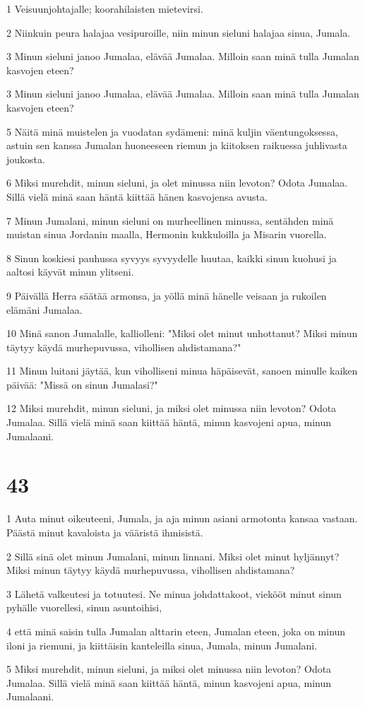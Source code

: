 \par 1 Veisuunjohtajalle; koorahilaisten mietevirsi.
\par 2 Niinkuin peura halajaa vesipuroille, niin minun sieluni halajaa sinua, Jumala.
\par 3 Minun sieluni janoo Jumalaa, elävää Jumalaa. Milloin saan minä tulla Jumalan kasvojen eteen?
\par 3 Minun sieluni janoo Jumalaa, elävää Jumalaa. Milloin saan minä tulla Jumalan kasvojen eteen?
\par 5 Näitä minä muistelen ja vuodatan sydämeni: minä kuljin väentungoksessa, astuin sen kanssa Jumalan huoneeseen riemun ja kiitoksen raikuessa juhlivasta joukosta.
\par 6 Miksi murehdit, minun sieluni, ja olet minussa niin levoton? Odota Jumalaa. Sillä vielä minä saan häntä kiittää hänen kasvojensa avusta.
\par 7 Minun Jumalani, minun sieluni on murheellinen minussa, sentähden minä muistan sinua Jordanin maalla, Hermonin kukkuloilla ja Misarin vuorella.
\par 8 Sinun koskiesi pauhussa syvyys syvyydelle huutaa, kaikki sinun kuohusi ja aaltosi käyvät minun ylitseni.
\par 9 Päivällä Herra säätää armonsa, ja yöllä minä hänelle veisaan ja rukoilen elämäni Jumalaa.
\par 10 Minä sanon Jumalalle, kalliolleni: "Miksi olet minut unhottanut? Miksi minun täytyy käydä murhepuvussa, vihollisen ahdistamana?"
\par 11 Minun luitani jäytää, kun viholliseni minua häpäisevät, sanoen minulle kaiken päivää: "Missä on sinun Jumalasi?"
\par 12 Miksi murehdit, minun sieluni, ja miksi olet minussa niin levoton? Odota Jumalaa. Sillä vielä minä saan kiittää häntä, minun kasvojeni apua, minun Jumalaani.

\chapter{43}

\par 1 Auta minut oikeuteeni, Jumala, ja aja minun asiani armotonta kansaa vastaan. Päästä minut kavaloista ja vääristä ihmisistä.
\par 2 Sillä sinä olet minun Jumalani, minun linnani. Miksi olet minut hyljännyt? Miksi minun täytyy käydä murhepuvussa, vihollisen ahdistamana?
\par 3 Lähetä valkeutesi ja totuutesi. Ne minua johdattakoot, viekööt minut sinun pyhälle vuorellesi, sinun asuntoihisi,
\par 4 että minä saisin tulla Jumalan alttarin eteen, Jumalan eteen, joka on minun iloni ja riemuni, ja kiittäisin kanteleilla sinua, Jumala, minun Jumalani.
\par 5 Miksi murehdit, minun sieluni, ja miksi olet minussa niin levoton? Odota Jumalaa. Sillä vielä minä saan kiittää häntä, minun kasvojeni apua, minun Jumalaani.

